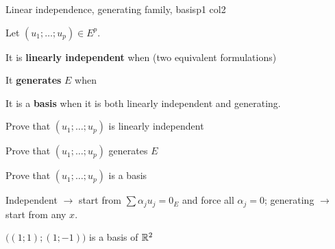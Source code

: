 \documentclass[course,noautoquant,noautokw]{neyvia-study}
\begin{document}
\begin{concept}[1.15]{Linear independence, generating family, basis}{p1 col2}
\begin{definition}
\noindent Let $(u_1;\dots;u_p)\in E^p$.
\par\noindent It is \textbf{linearly independent} when (two equivalent formulations)
\par\noindent It \textbf{generates} $E$ when
\par\noindent It is a \textbf{basis} when it is both linearly independent and generating.
\end{definition}
\begin{method}{Prove that $(u_1;\dots;u_p)$ is linearly independent}
\step{$\displaystyle \cdots$}
\end{method}
\begin{method}{Prove that $(u_1;\dots;u_p)$ generates $E$}
\end{method}
\begin{method}{Prove that $(u_1;\dots;u_p)$ is a basis}
\end{method}
\begin{reflex}
Independent \ensuremath{\rightarrow} start from $\sum\alpha_j u_j=0_E$ and force all $\alpha_j=0$; generating \ensuremath{\rightarrow} start from any $x$.
\end{reflex}
\begin{worked}{$\big((1;1);(1;-1)\big)$ is a basis of $\mathbb{R}^2$}

\end{worked}
\end{concept}
\end{document}
